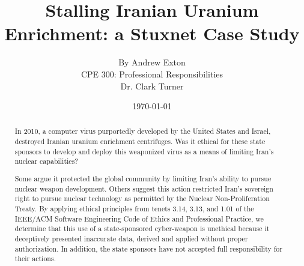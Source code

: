 \documentclass[12pt]{article}
\begin{document}
\title{\vfill Stalling Iranian Uranium Enrichment: a Stuxnet Case Study } %
\author{
By Andrew Exton \vspace{10pt} \\
CPE 300: Professional Responsibilities  \vspace{10pt} \\
Dr. Clark Turner \vspace{10pt} \\
}
\date{\today} %

\maketitle

\vfill  %
\begin{abstract}

In 2010, a computer virus purportedly developed by the United States and Israel, destroyed Iranian uranium enrichment centrifuges.\cite{theRealStoryOfStuxnet} Was it ethical for these state sponsors to develop and deploy this weaponized virus as a means of limiting Iran's nuclear capabilities?

Some argue it protected the global community by limiting Iran's ability to pursue nuclear weapon development.\cite{theRealStoryOfStuxnet} Others suggest this action restricted Iran's sovereign right to pursue nuclear technology as permitted by the Nuclear Non-Proliferation Treaty.\cite{lookIntoIranianNuclearProgram} By applying ethical principles from tenets 3.14, 3.13, and 1.01 of the IEEE/ACM Software Engineering Code of Ethics and Professional Practice, we determine that this use of a state-sponsored cyber-weapon is unethical because it deceptively presented inaccurate data, derived and applied without proper authorization. In addition, the state sponsors have not accepted full responsibility for their actions.


\end{abstract}

\thispagestyle{empty} %
\newpage

\tableofcontents
\newpage
\end{document}
